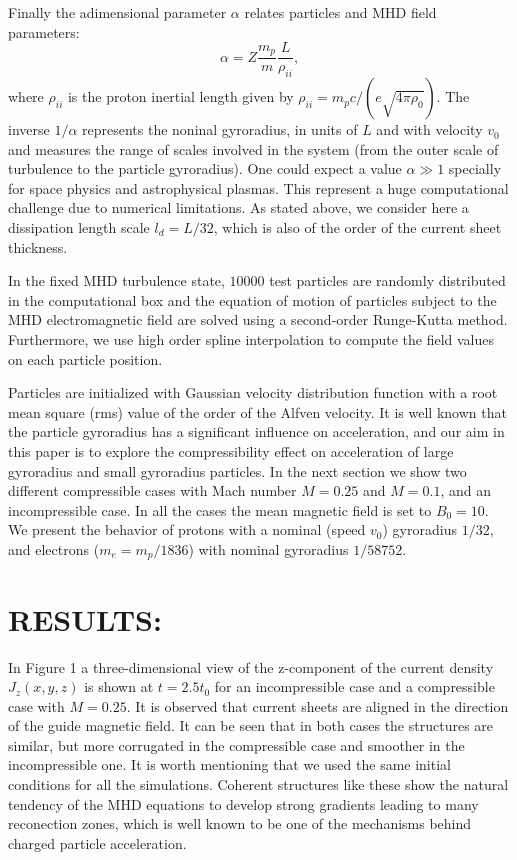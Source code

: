 \documentclass[%
aip,pop,amsmath,amssymb,
 reprint,%
]{revtex4-1}
\begin{document}
Finally the adimensional parameter $\alpha$ relates particles and MHD field parameters:
\begin{equation}
\alpha=Z\frac{m_p}{m}\frac{L}{\rho_{ii}},
\end{equation}
where $\rho_{ii}$ is the proton inertial length given 
by $\rho_{ii}=m_pc/(e\sqrt{4\pi\rho_0})$. The inverse $1/\alpha$ represents the noninal 
gyroradius, in units of $L$ and with velocity $v_0$ and measures the range of 
scales involved in the system (from the outer scale of turbulence to the particle
gyroradius). One could expect a value
$\alpha \gg 1$ specially for space physics and astrophysical plasmas.
This represent a huge computational challenge due to 
numerical limitations. As stated above, we consider here a dissipation length scale
$l_d=L/32$, which is also of the order of the current sheet thickness.



In the fixed MHD turbulence state, $10000$ test particles are 
randomly distributed 
in the computational box and the equation of motion of particles 
subject to the MHD
electromagnetic field are solved using a second-order Runge-Kutta method. 
Furthermore, we use high order spline interpolation to compute the field values on each
particle position.


Particles are initialized with Gaussian velocity distribution function with a 
root mean square (rms) value of the order of the Alfven velocity. It is well known that the 
particle gyroradius has a significant influence 
on acceleration, and our aim in this paper is to explore the compressibility effect on 
acceleration of large gyroradius 
and small gyroradius particles. 
In the next section we show two different compressible cases 
with Mach number $M=0.25$ and $M=0.1$, and an incompressible case. In all the cases the 
mean magnetic field is set to $B_0=10$. We present the behavior of protons with a 
nominal (speed $v_0$) gyroradius $1/32$, and electrons  ($m_e=m_p/1836$)
with nominal gyroradius $1/58752$.


\section{\label{sec:level3}RESULTS:}

In Figure 1 a three-dimensional view of the z-component of the current density $J_z(x,y,z)$ is shown at $t=2.5t_0$ for an incompressible case and a compressible case with $M=0.25$. It is observed that current sheets are aligned in the direction of the guide magnetic field. 
It can be seen that in both cases the structures are similar,
but more corrugated in the compressible case and smoother in the incompressible one. It is worth mentioning that we used the same 
initial conditions for all the simulations. Coherent structures like
these show the natural tendency of the MHD equations to develop strong gradients leading
to many reconection zones, which is well known to be one of the mechanisms behind
charged particle acceleration.
\end{document}
